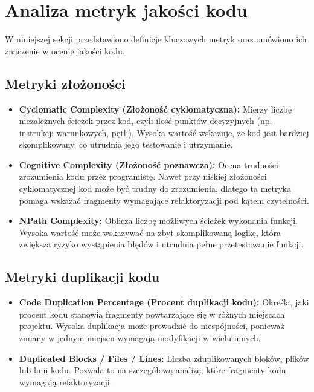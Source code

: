 \documentclass[a4paper,12pt]{article}
\begin{document}
\section{Analiza metryk jakości kodu} W niniejszej sekcji przedstawiono definicje kluczowych metryk oraz omówiono ich znaczenie w ocenie jakości kodu. \subsection{Metryki złożoności}
\begin{itemize} \item \textbf{Cyclomatic Complexity (Złożoność cyklomatyczna):} Mierzy liczbę niezależnych ścieżek przez kod, czyli ilość punktów decyzyjnych (np. instrukcji warunkowych, pętli). Wysoka wartość wskazuje, że kod jest bardziej skomplikowany, co utrudnia jego testowanie i utrzymanie. \item \textbf{Cognitive Complexity (Złożoność poznawcza):} Ocena trudności zrozumienia kodu przez programistę. Nawet przy niskiej złożoności cyklomatycznej kod może być trudny do zrozumienia, dlatego ta metryka pomaga wskazać fragmenty wymagające refaktoryzacji pod kątem czytelności. \item \textbf{NPath Complexity:} Oblicza liczbę możliwych ścieżek wykonania funkcji. Wysoka wartość może wskazywać na zbyt skomplikowaną logikę, która zwiększa ryzyko wystąpienia błędów i utrudnia pełne przetestowanie funkcji. \end{itemize}
\subsection{Metryki duplikacji kodu}
\begin{itemize} \item \textbf{Code Duplication Percentage (Procent duplikacji kodu):} Określa, jaki procent kodu stanowią fragmenty powtarzające się w różnych miejscach projektu. Wysoka duplikacja może prowadzić do niespójności, ponieważ zmiany w jednym miejscu wymagają modyfikacji w wielu innych. \item \textbf{Duplicated Blocks / Files / Lines:} Liczba zduplikowanych bloków, plików lub linii kodu. Pozwala to na szczegółową analizę, które fragmenty kodu wymagają refaktoryzacji. \end{itemize}
\end{document}
